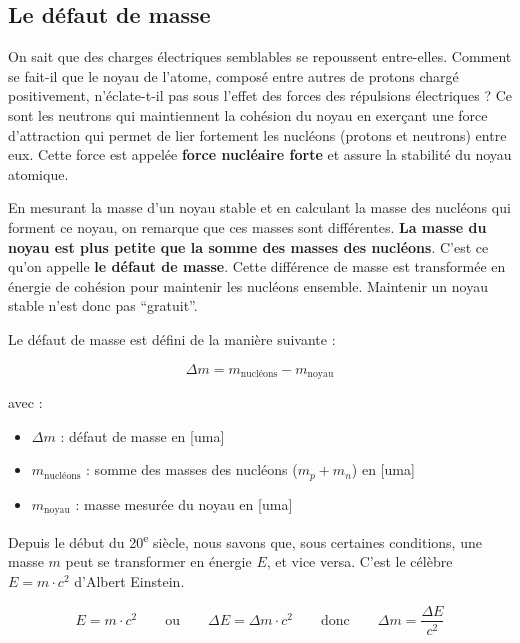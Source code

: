 \documentclass[
  11pt,
  a4paper,
  openany]{book}
\providecommand{\tightlist}{%
  \setlength{\itemsep}{0pt}\setlength{\parskip}{0pt}}
\begin{document}
\hypertarget{le-duxe9faut-de-masse}{%
\subsection{Le défaut de masse}\label{le-duxe9faut-de-masse}}

On sait que des charges électriques semblables se repoussent entre-elles. Comment se fait-il que le noyau de l'atome, composé entre autres de protons chargé positivement, n'éclate-t-il pas sous l'effet des forces des répulsions électriques ? Ce sont les neutrons qui maintiennent la cohésion du noyau en exerçant une force d'attraction qui permet de lier fortement les nucléons (protons et neutrons) entre eux. Cette force est appelée \textbf{force nucléaire forte} et assure la stabilité du noyau atomique.

En mesurant la masse d'un noyau stable et en calculant la masse des nucléons qui forment ce noyau, on remarque que ces masses sont différentes. \textbf{La masse du noyau est plus petite que la somme des masses des nucléons}. C'est ce qu'on appelle \textbf{le défaut de masse}. Cette différence de masse est transformée en énergie de cohésion pour maintenir les nucléons ensemble. Maintenir un noyau stable n'est donc pas ``gratuit''.

Le défaut de masse est défini de la manière suivante :

\[
\Delta m = m_{\text{nucléons}} - m_{\text{noyau}}
\]

avec :

\begin{itemize}
\tightlist
\item
  \(\Delta m\) : défaut de masse en {[}uma{]}\\
\item
  \(m_{\text{nucléons}}\) : somme des masses des nucléons (\(m_p + m_n\)) en {[}uma{]}\\
\item
  \(m_{\text{noyau}}\) : masse mesurée du noyau en {[}uma{]}
\end{itemize}

\clearpage

Depuis le début du 20\textsuperscript{e} siècle, nous savons que, sous certaines conditions, une masse \(m\) peut se transformer en énergie \(E\), et vice versa. C'est le célèbre \(E = m \cdot c^2\) d'Albert Einstein.

\[
E = m \cdot c^2 \qquad \text{ou} \qquad \Delta E = \Delta m \cdot c^2 \qquad \text{donc} \qquad \Delta m = \frac{\Delta E}{c^2}
\]
\end{document}
